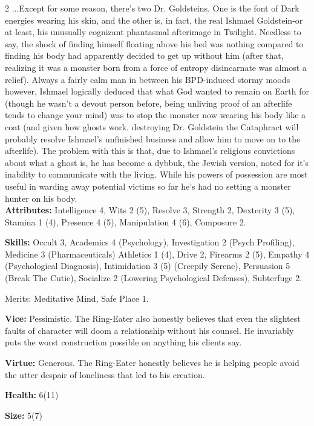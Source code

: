\begin{multicols}{2}
...Except for some reason, there's two Dr. Goldsteins. One is the font of Dark energies wearing his skin, and the other is, in fact, the real Ishmael Goldstein-or at least, his unusually cognizant phantasmal afterimage in Twilight. Needless to say, the shock of finding himself floating above his bed was nothing compared to finding his body had apparently decided to get up without him (after that, realizing it was a monster born from a force of entropy disincarnate was almost a relief). Always a fairly calm man in between his BPD-induced stormy moods however, Ishmael logically deduced that what God wanted to remain on Earth for (though he wasn't a devout person before, being unliving proof of an afterlife tends to change your mind) was to stop the monster now wearing his body like a coat (and given how ghosts work, destroying Dr. Goldstein the Cataphract will probably resolve Ishmael's unfinished business and allow him to move on to the afterlife). The problem with this is that, due to Ishmael's religious 
convictions about what a ghost is, he has become a dybbuk, the Jewish version, noted for it's inability to communicate with the living. While his powers of possession are most useful in warding away potential victims so far he's had no setting a monster hunter on his body.\\


\noindent \textbf{Attributes:} Intelligence 4, Wits 2 (5), Resolve 3, Strength 2, Dexterity 3 (5), Stamina 1 (4), Presence 4 (5), Manipulation 4 (6), Composure 2.

\noindent \textbf{Skills:} Occult 3, Academics 4 (Psychology), Investigation 2 (Psych Profiling), Medicine 3 (Pharmaceuticals) Athletics 1 (4), Drive 2, Firearms 2 (5), Empathy 4 (Psychological Diagnosis), Intimidation 3 (5) (Creepily Serene), Persuasion 5 (Break The Cutie), Socialize 2 (Lowering Psychological Defenses), Subterfuge 2.

Merits: Meditative Mind, Safe Place 1.

\noindent \textbf{Vice:} Pessimistic. The Ring-Eater also honestly believes that even the slightest faults of character will doom a relationship without his counsel. He invariably puts the worst construction possible on anything his clients say.

\noindent \textbf{Virtue:} Generous.  The Ring-Eater honestly believes he is helping people avoid the utter despair of loneliness that led to his creation.

\noindent \textbf{Health:} 6(11)

\noindent \textbf{Size:} 5(7)


\end{multicols}

